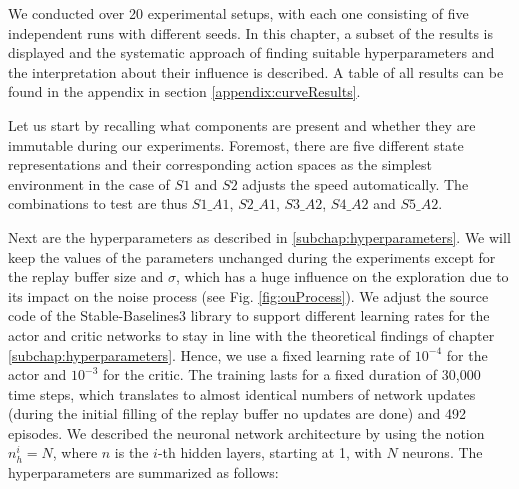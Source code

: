 We conducted over 20 experimental setups, with each one consisting of five independent runs with different seeds. In this chapter, a subset of the results is displayed and the systematic approach of finding suitable hyperparameters and the interpretation about their influence is described. A table of all results can be found in the appendix in section \ref{appendix:curveResults}.
\par
Let us start by recalling what components are present and whether they are immutable during our experiments. Foremost, there are five different state representations and their corresponding action spaces as the simplest environment in the case of $S1$ and $S2$ adjusts the speed automatically. The combinations to test are thus $S1\_A1$, $S2\_A1$, $S3\_A2$, $S4\_A2$ and $S5\_A2$.
\par
Next are the hyperparameters as described in \ref{subchap:hyperparameters}. We will keep the values of the parameters unchanged during the experiments except for the replay buffer size and $\sigma$, which has a huge influence on the exploration due to its impact on the noise process (see Fig. \ref{fig:ouProcess}). We adjust the source code of the Stable-Baselines3 library to support different learning rates for the actor and critic networks to stay in line with the theoretical findings of chapter \ref{subchap:hyperparameters}. Hence, we use a fixed learning rate of $10^{-4}$ for the actor and  $10^{-3}$ for the critic. The training lasts for a fixed duration of 30,000 time steps, which translates to almost identical numbers of network updates (during the initial filling of the replay buffer no updates are done) and 492 episodes. We described the neuronal network architecture by using the notion $n_h^i= N$, where $n$ is the $i$-th hidden layers, starting at 1, with $N$ neurons. The hyperparameters are summarized as follows:


